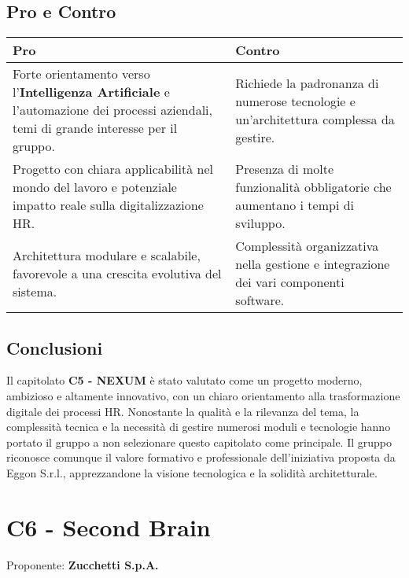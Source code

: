 \documentclass[a4paper,12pt]{article}
\begin{document}
{{{    \subsection{Pro e Contro}
        \begin{center}
            \begin{tabular}{|p{9cm}|p{5cm}|}
                \hline
                \textbf{Pro} & \textbf{Contro} \\
                \hline
                Forte orientamento verso l’\textbf{Intelligenza Artificiale} e l’automazione dei processi aziendali, temi di grande interesse per il gruppo. & Richiede la padronanza di numerose tecnologie e un’architettura complessa da gestire. \\
                \hline
                Progetto con chiara applicabilità nel mondo del lavoro e potenziale impatto reale sulla digitalizzazione HR. & Presenza di molte funzionalità obbligatorie che aumentano i tempi di sviluppo. \\
                \hline
                Architettura modulare e scalabile, favorevole a una crescita evolutiva del sistema. & Complessità organizzativa nella gestione e integrazione dei vari componenti software. \\
                \hline
            \end{tabular}
        \end{center}
    

    \subsection{Conclusioni}
        Il capitolato \textbf{C5 - NEXUM} è stato valutato come un progetto moderno, ambizioso e altamente innovativo, con un chiaro orientamento alla trasformazione digitale dei processi HR.
        Nonostante la qualità e la rilevanza del tema, la complessità tecnica e la necessità di gestire numerosi moduli e tecnologie hanno portato il gruppo a non selezionare questo capitolato come principale.
        Il gruppo riconosce comunque il valore formativo e professionale dell’iniziativa proposta da Eggon S.r.l., apprezzandone la visione tecnologica e la solidità architetturale.


\newpage

\section{C6 - Second Brain}
    Proponente: \textbf{Zucchetti S.p.A.}

}}}
\end{document}
